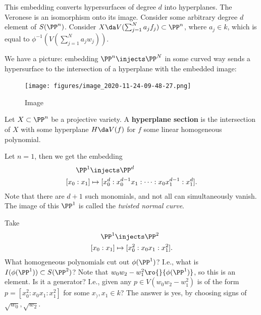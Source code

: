 \begin{remark}

This embedding converts hypersurfaces of degree \(d\) into hyperplanes.
The Veronese is an isomorphism onto its image. Consider some arbitrary
degree \(d\) element of \(S(\PP^n)\). Consider
\(X \da V(\sum_{j=1}^N a_j f_j) \subset\PP^n\), where \(a_j\in k\),
which is equal to \(\phi^{-1}(V(\sum_{j=1}^N a_j w_j ))\).


We have a picture: embedding \(\PP^n\injects \PP^N\) in some curved way
sends a hypersurface to the intersection of a hyperplane with the
embedded image:

\begin{figure}
\centering
\texttt{[image: figures/image\_2020-11-24-09-48-27.png]}
\caption{Image}
\end{figure}

\end{remark}

\begin{definition}

Let \(X \subset\PP^n\) be a projective variety. A \textbf{hyperplane
section} is the intersection of \(X\) with some hyperplane
\(H \da V(f)\) for \(f\) some linear homogeneous polynomial.

\end{definition}

\begin{example}

Let \(n=1\), then we get the embedding
\begin{align*}  
\PP^1 &\injects \PP^d \\
[x_0: x_1] &\mapsto [x_0^d: x_0^{d-1}x_1 : \cdots : x_0 x_1^{d-1} : x_1^d]
.\end{align*} Note that there are \(d+1\) such monomials, and not all
can simultaneously vanish. The image of this \(\PP^1\) is called the
\emph{twisted normal curve}.

\end{example}

\begin{example}[?]

Take
\begin{align*}  
\PP^1 &\injects \PP^2 \\
[x_0 : x_1] &\mapsto [x_0^2 : x_0 x_1: x_1^2]
.\end{align*} What homogeneous polynomials cut out \(\phi(\PP^1)\)?
I.e., what is \(I(\phi(\PP^1)) \subset S(\PP^2)\)? Note that
\(w_0 w_2 - w_1^2 \ro{}{\phi(\PP^1)}\), so this is an element. Is it a
generator? I.e., given any \(p\in V(w_0 w_2 - w_1^2)\) is of the form
\(p = [x_0^2 : x_0 x_1: x_1^2]\) for some \(x_), x_1 \in k\)? The answer
is yes, by choosing signs of \(\sqrt{w_0}, \sqrt{w_2}\).

\end{example}

